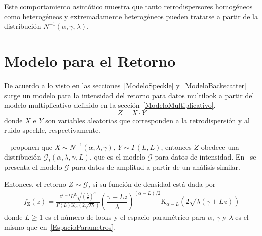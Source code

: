 Este comportamiento asintótico muestra que tanto retrodispersores homogéneos como heterogéneos y extremadamente heterogéneos pueden tratarse a partir de la distribución $N^{-1}(\alpha,\gamma,\lambda)$.


\section{Modelo para el Retorno}
\label{Retorno}

De acuerdo a lo visto en las secciones~\ref{ModeloSpeckle} y~\ref{ModeloBackscatter} surge un modelo para la intensidad del retorno para datos multilook a partir del modelo multiplicativo definido en la sección~\ref{ModeloMultiplicativo}.
\begin{equation*}
Z=X \cdot Y  
\end{equation*}
donde $X$ e $Y$ son variables aleatorias que corresponden a la retrodispersión y al ruido speckle, respectivamente. 

~\citet{Frery99} proponen que $X \sim N^{-1}(\alpha,\lambda,\gamma )$, $Y \sim \Gamma(L,L)$, entonces $Z$ obedece una distribución $\mathcal G_I(\alpha,\lambda,\gamma,L )$, que es el modelo $\mathcal{G}$ para datos de intensidad. En~\citet{Frery97} se presenta el modelo $\mathcal{G}$ para datos de amplitud a partir de un análisis similar.

Entonces, el retorno $Z \sim \mathcal{G}_I$ si su función de densidad está dada por
\begin{align}
\label{ModeloGI}
f_{\text{Z}}( z) =\frac{z^{L-1} L^L \sqrt{(\frac{\lambda}{\gamma})^{\alpha}}}{\Gamma(L)\text{K}_{\alpha}(2 \sqrt{\lambda \gamma})} \left(\dfrac{\gamma + Lz}{\lambda}\right)^{(\alpha-L)/2} \text{K}_{\alpha-L}(2\sqrt{\lambda(\gamma+Lz) })
\end{align}
donde $L\geq 1$ es el número de looks y el espacio paramétrico para $\alpha$, $\gamma$ y $\lambda$ es el mismo que en~\eqref{EspacioParametros}.

